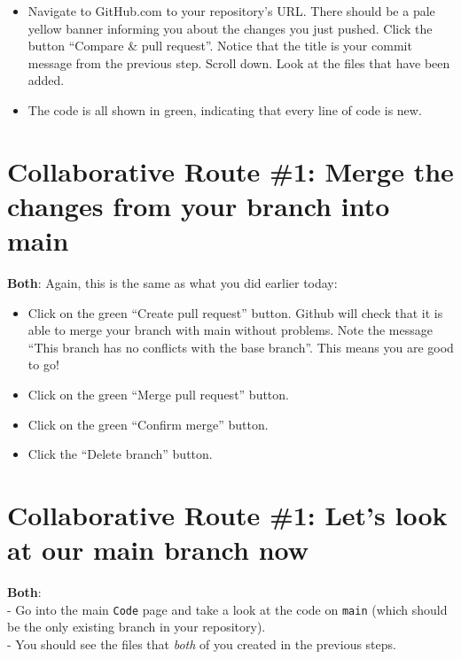 \documentclass[
]{book}
\providecommand{\tightlist}{%
  \setlength{\itemsep}{0pt}\setlength{\parskip}{0pt}}
\begin{document}
\begin{itemize}
\tightlist
\item
  Navigate to GitHub.com to your repository's URL. There should be a pale yellow
  banner informing you about the changes you just pushed. Click the button
  ``Compare \& pull request''. Notice that the title is your commit message from the
  previous step. Scroll down. Look at the files that have been added.
\item
  The code is all shown in green, indicating that every line of code is new.
\end{itemize}

\hypertarget{collaborative-route-1-merge-the-changes-from-your-branch-into-main}{%
\section{Collaborative Route \#1: Merge the changes from your branch into main}\label{collaborative-route-1-merge-the-changes-from-your-branch-into-main}}

\textbf{Both}:
Again, this is the same as what you did earlier today:

\begin{itemize}
\tightlist
\item
  Click on the green ``Create pull request'' button. Github will check that it
  is able to merge your branch with main without problems. Note the message ``This
  branch has no conflicts with the base branch''. This means you are good to go!
\item
  Click on the green ``Merge pull request'' button.\\
\item
  Click on the green ``Confirm merge'' button.
\item
  Click the ``Delete branch'' button.
\end{itemize}

\hypertarget{collaborative-route-1-lets-look-at-our-main-branch-now}{%
\section{Collaborative Route \#1: Let's look at our main branch now}\label{collaborative-route-1-lets-look-at-our-main-branch-now}}

\textbf{Both}:\\
- Go into the main \texttt{Code} page and take a look at the code on \texttt{main} (which should be the only existing branch in your repository).\\
- You should see the files that \emph{both} of you created in the previous steps.
\end{document}
